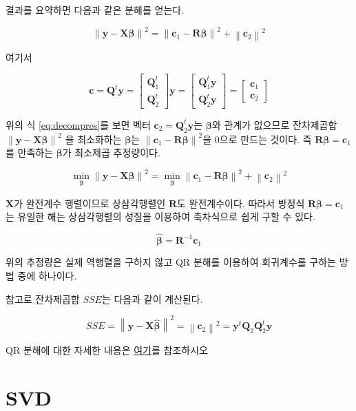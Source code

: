 \documentclass[
  10pt,
]{book}
\makeatletter
\newcommand{\norm}[1]{\left\lVert#1\right\rVert}
\newenvironment{kframe}{%
\medskip{}
\setlength{\fboxsep}{.8em}
 \def\at@end@of@kframe{}%
 \ifinner\ifhmode%
  \def\at@end@of@kframe{\end{minipage}}%
  \begin{minipage}{\columnwidth}%
 \fi\fi%
 \def\FrameCommand##1{\hskip\@totalleftmargin \hskip-\fboxsep
 \colorbox{shadecolor}{##1}\hskip-\fboxsep
     \hskip-\linewidth \hskip-\@totalleftmargin \hskip\columnwidth}%
 \MakeFramed {\advance\hsize-\width
   \@totalleftmargin\z@ \linewidth\hsize
   \@setminipage}}%
 {\par\unskip\endMakeFramed%
 \at@end@of@kframe}
\newenvironment{rmdblock}[1]
  {
  \begin{itemize}
  \renewcommand{\labelitemi}{
    \raisebox{-.7\height}[0pt][0pt]{
      {\setkeys{Gin}{width=3em,keepaspectratio}\texttt{[image: images/\#1]}}
    }
  }
  \setlength{\fboxsep}{1em}
  \begin{kframe}
  \item
  }
  {
  \end{kframe}
  \end{itemize}
  }
\newenvironment{rmdnote}
  {\begin{rmdblock}{note}}
  {\end{rmdblock}}
\theoremstyle{definition}
\theoremstyle{definition}
\theoremstyle{definition}
\theoremstyle{definition}
\theoremstyle{remark}
\makeatother
\begin{document}
결과를 요약하면 다음과 같은 분해를 얻는다.

\begin{equation}
\norm{ \bm y-\bm X \bm \beta}^2 = \norm{ \bm c_1 - \bm R \bm \beta }^2 + \norm{\bm c_2}^2 
\label{eq:decompres}
\end{equation}

여기서

\[
\bm c= \bm Q^t \bm y=
 \begin{bmatrix} 
   \bm Q_1^t \\ 
   \bm Q_2^t 
   \end{bmatrix} \bm y 
   =
   \begin{bmatrix} 
   \bm Q_1^t \bm y  \\ 
   \bm Q_2^t \bm y 
   \end{bmatrix}
   = \begin{bmatrix} 
   \bm c_1 \\ 
   \bm c_2 
\end{bmatrix}  
\]

위의 식 \eqref{eq:decompres}를 보면 벡터 \(\bm c_2= \bm Q_2^t \bm y\)는 \(\bm \beta\)와 관계가 없으므로 잔차제곱합 \(\norm{ \bm y-\bm X \bm \beta}^2\) 을 최소화하는
\(\bm \beta\)는 \(\norm{ \bm c_1 - \bm R \bm \beta }^2\)을 0으로 만드는 것이다. 즉 \(\bm R \bm \beta =\bm c_1\)를 만족하는 \(\bm \beta\)가 최소제곱 추정량이다.

\[
\min_{\bm \beta} \norm{ \bm y-\bm X \bm \beta}^2 = \min_{\bm \beta} \norm{ \bm c_1 - \bm R \bm \beta }^2 +  \norm{\bm c_2}^2 
\]

\(\bm X\)가 완전계수 행렬이므로 상삼각행렬인 \(\bm R\)도 완전계수이다. 따라서 방정식 \(\bm R \bm \beta = \bm c_1\)는 유일한 해는 상삼각행렬의 성질을 이용하여 축차식으로 쉽게 구할 수 있다.

\[ \hat {\bm \beta} =\bm R^{-1} \bm c_1 \]

위의 추정량은 실제 역행렬을 구하지 않고 QR 분해를 이용하여 회귀계수를 구하는 방법 중에 하나이다.

참고로 잔차제곱합 \(SSE\)는 다음과 같이 계산된다.

\[ SSE = \norm{ \bm y-\bm X \hat {\bm \beta}}^2 = \norm{\bm c_2}^2 = \bm y^t \bm Q_2 \bm Q_2^t \bm y \]

\begin{rmdnote}
QR 분해에 대한 자세한 내용은 \href{https://ilovedata.github.io/teaching/matrix1/qr.pdf}{여기}를 참조하시오
\end{rmdnote}

\hypertarget{svd}{%
\section{SVD}\label{svd}}
\end{document}
